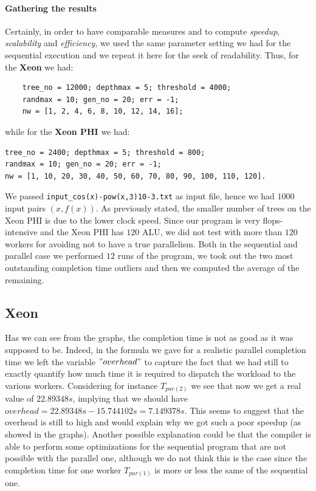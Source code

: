 \documentclass[10pt]{article}
\numberwithin{equation}{section}
\begin{document}
\paragraph{Gathering the results}
Certainly, in order to have comparable measures and to compute \emph{speedup}, \emph{scalability} and \emph{efficiency}, we used the same parameter setting we had for the sequential execution and we repeat it here for the seek of readability. Thus, for the \textbf{Xeon} we had:
\begin{verbatim}
	tree_no = 12000; depthmax = 5; threshold = 4000;
	randmax = 10; gen_no = 20; err = -1;
	nw = [1, 2, 4, 6, 8, 10, 12, 14, 16];
\end{verbatim}
while for the \textbf{Xeon PHI} we had:
\begin{verbatim}
tree_no = 2400; depthmax = 5; threshold = 800;
randmax = 10; gen_no = 20; err = -1;
nw = [1, 10, 20, 30, 40, 50, 60, 70, 80, 90, 100, 110, 120].
\end{verbatim}
We passed \verb|input_cos(x)-pow(x,3)10-3.txt| as input file, hence we had $1000$ input pairs $(x, f(x))$. As previously stated, the smaller number of trees on the Xeon PHI is due to the lower clock speed. Since our program is very flops-intensive and the Xeon PHI has $120$ ALU, we did not test with more than $120$ workers for avoiding not to have a true parallelism. Both in the sequential and parallel case we performed $12$ runs of the program, we took out the two most outstanding completion time outliers and then we computed the average of the remaining. 

\subsection{Xeon}
Has we can see from the graphs, the completion time is not as good as it was supposed to be. Indeed, in the formula we gave for a realistic parallel completion time we left the variable $"overhead"$ to capture the fact that we had still to exactly quantify how much time it is required to dispatch the workload to the various workers. Considering for instance $T_{par\left(2\right)}$ we see that now we get a real value of $22.89348s$, implying that we should have $overhead = 22.89348s - 15.744102s = 7.149378s$. This seems to suggest that the overhead is still to high and would explain why we got such a poor speedup (as showed in the graphs). Another possible explanation could be that the compiler is able to perform some optimizations for the sequential program that are not possible with the parallel one, although we do not think this is the case since the completion time for one worker $T_{par\left(1\right)}$ is more or less the same of the sequential one.
\end{document}
